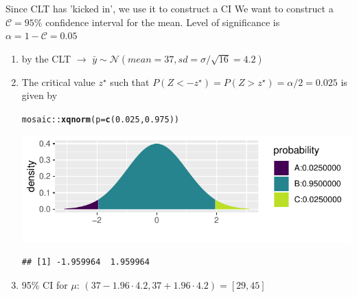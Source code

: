 \documentclass{beamer}\usepackage[]{graphicx}\usepackage[]{color}
\newcommand{\hlnum}[1]{\textcolor[rgb]{0.686,0.059,0.569}{#1}}%
\newcommand{\hlopt}[1]{\textcolor[rgb]{0,0,0}{#1}}%
\newcommand{\hlstd}[1]{\textcolor[rgb]{0.345,0.345,0.345}{#1}}%
\newcommand{\hlkwc}[1]{\textcolor[rgb]{0.333,0.667,0.333}{#1}}%
\newcommand{\hlkwd}[1]{\textcolor[rgb]{0.737,0.353,0.396}{\textbf{#1}}}%
\newenvironment{knitrout}{}{} %
\begin{document}
\begin{frame}[fragile]{Since CLT has 'kicked in', we use it to construct a CI}
\small
We want to construct a $\mathcal{C} = 95\%$ confidence interval for the mean. Level of significance is $\alpha = 1-\mathcal{C} = 0.05$ \pause

\begin{enumerate}
	\setlength\itemsep{1em}
	\item by the CLT $\to$ $\bar{y} \sim \mathcal{N}(mean = 37, sd = \sigma/\sqrt{16} = 4.2)$ \pause
	\item The critical value $z^\star$ such that $P(Z < -z^\star) = P(Z > z^\star) = \alpha/2 = 0.025$ is given by 
\begin{knitrout}\scriptsize
{}\color{fgcolor}
\begin{alltt}
\hlstd{mosaic}\hlopt{::}\hlkwd{xqnorm}\hlstd{(}\hlkwc{p} \hlstd{=} \hlkwd{c}\hlstd{(}\hlnum{0.025}\hlstd{,} \hlnum{0.975}\hlstd{))}
\end{alltt}


{\centering \includegraphics[width=1\linewidth]{figure/unnamed-chunk-4-1} 

}


\begin{verbatim}
## [1] -1.959964  1.959964
\end{verbatim}

\end{knitrout}
	\pause
	\item 95\% CI for $\mu$: $(37 - 1.96 \cdot 4.2, 37 + 1.96 \cdot 4.2) = [29, 45]$
\end{enumerate}
\end{frame}
\end{document}

